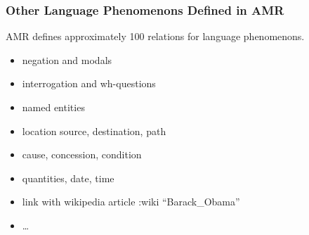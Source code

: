 \documentclass{beamer}
\begin{document}
\begin{frame}
    \frametitle{Other Language Phenomenons Defined in AMR}

    AMR defines approximately 100 relations for language phenomenons.

    \begin{itemize}
        \item negation and modals
        \item interrogation and wh-questions
        \item named entities
        \item location source, destination, path
        \item cause, concession, condition
        \item quantities, date, time
        \item link with wikipedia article :wiki ``Barack\_Obama''
        \item \dots
    \end{itemize}

\end{frame}
\end{document}
